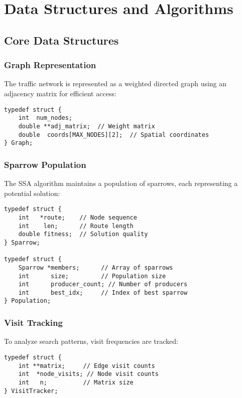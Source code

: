 \documentclass[conference]{IEEEtran}
\begin{document}
\section{Data Structures and Algorithms}

\subsection{Core Data Structures}

\subsubsection{Graph Representation}
The traffic network is represented as a weighted directed graph using an adjacency matrix for efficient access:

\begin{lstlisting}
typedef struct {
    int  num_nodes;
    double **adj_matrix;  // Weight matrix
    double  coords[MAX_NODES][2];  // Spatial coordinates
} Graph;
\end{lstlisting}

\subsubsection{Sparrow Population}
The SSA algorithm maintains a population of sparrows, each representing a potential solution:

\begin{lstlisting}
typedef struct {
    int   *route;    // Node sequence
    int    len;      // Route length
    double fitness;  // Solution quality
} Sparrow;

typedef struct {
    Sparrow *members;      // Array of sparrows
    int      size;         // Population size
    int      producer_count; // Number of producers
    int      best_idx;     // Index of best sparrow
} Population;
\end{lstlisting}

\subsubsection{Visit Tracking}
To analyze search patterns, visit frequencies are tracked:

\begin{lstlisting}
typedef struct {
    int **matrix;     // Edge visit counts
    int  *node_visits; // Node visit counts
    int   n;          // Matrix size
} VisitTracker;
\end{lstlisting}
\end{document}
